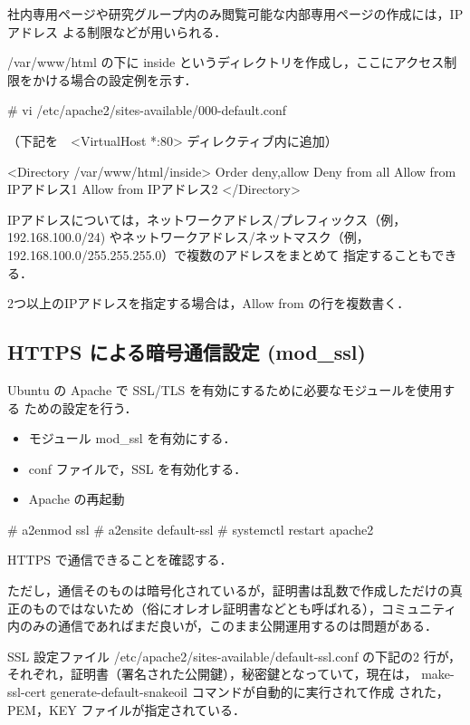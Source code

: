 社内専用ページや研究グループ内のみ閲覧可能な内部専用ページの作成には，IPアドレス
よる制限などが用いられる．

/var/www/html の下に inside というディレクトリを作成し，ここにアクセス制
限をかける場合の設定例を示す．

\begin{cli}
# vi /etc/apache2/sites-available/000-default.conf

（下記を　<VirtualHost *:80> ディレクティブ内に追加）

<Directory /var/www/html/inside>
        Order deny,allow
        Deny from all
        Allow from IPアドレス1
        Allow from IPアドレス2
</Directory>
\end{cli}

IPアドレスについては，ネットワークアドレス/プレフィックス（例，192.168.100.0/24)
やネットワークアドレス/ネットマスク（例，192.168.100.0/255.255.255.0）で複数のアドレスをまとめて
指定することもできる． 

2つ以上のIPアドレスを指定する場合は，Allow from の行を複数書く．




\subsection{HTTPS による暗号通信設定 (mod\_ssl)}

Ubuntu の Apache で SSL/TLS を有効にするために必要なモジュールを使用する
ための設定を行う．

\begin{itemize}
 \item モジュール mod\_ssl を有効にする．
 \item conf ファイルで，SSL を有効化する．
 \item Apache の再起動
\end{itemize}

\begin{cli}
# a2enmod ssl
# a2ensite default-ssl
# systemctl restart apache2
\end{cli}

HTTPS で通信できることを確認する．

ただし，通信そのものは暗号化されているが，証明書は乱数で作成しただけの真
正のものではないため（俗にオレオレ証明書などとも呼ばれる），コミュニティ
内のみの通信であればまだ良いが，このまま公開運用するのは問題がある．

SSL 設定ファイル /etc/apache2/sites-available/default-ssl.conf の下記の2 
行が，それぞれ，証明書（署名された公開鍵），秘密鍵となっていて，現在は，
make-ssl-cert generate-default-snakeoil コマンドが自動的に実行されて作成
された，PEM，KEY ファイルが指定されている．

